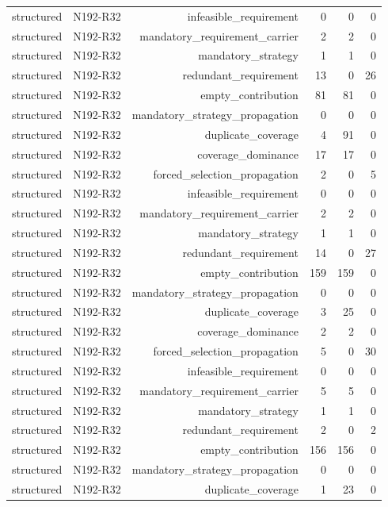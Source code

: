 {\begin{longtable}{lrrrrr}
structured & N192-R32 & infeasible\_requirement & 0 & 0 & 0 \\
structured & N192-R32 & mandatory\_requirement\_carrier & 2 & 2 & 0 \\
structured & N192-R32 & mandatory\_strategy & 1 & 1 & 0 \\
structured & N192-R32 & redundant\_requirement & 13 & 0 & 26 \\
structured & N192-R32 & empty\_contribution & 81 & 81 & 0 \\
structured & N192-R32 & mandatory\_strategy\_propagation & 0 & 0 & 0 \\
structured & N192-R32 & duplicate\_coverage & 4 & 91 & 0 \\
structured & N192-R32 & coverage\_dominance & 17 & 17 & 0 \\
structured & N192-R32 & forced\_selection\_propagation & 2 & 0 & 5 \\
structured & N192-R32 & infeasible\_requirement & 0 & 0 & 0 \\
structured & N192-R32 & mandatory\_requirement\_carrier & 2 & 2 & 0 \\
structured & N192-R32 & mandatory\_strategy & 1 & 1 & 0 \\
structured & N192-R32 & redundant\_requirement & 14 & 0 & 27 \\
structured & N192-R32 & empty\_contribution & 159 & 159 & 0 \\
structured & N192-R32 & mandatory\_strategy\_propagation & 0 & 0 & 0 \\
structured & N192-R32 & duplicate\_coverage & 3 & 25 & 0 \\
structured & N192-R32 & coverage\_dominance & 2 & 2 & 0 \\
structured & N192-R32 & forced\_selection\_propagation & 5 & 0 & 30 \\
structured & N192-R32 & infeasible\_requirement & 0 & 0 & 0 \\
structured & N192-R32 & mandatory\_requirement\_carrier & 5 & 5 & 0 \\
structured & N192-R32 & mandatory\_strategy & 1 & 1 & 0 \\
structured & N192-R32 & redundant\_requirement & 2 & 0 & 2 \\
structured & N192-R32 & empty\_contribution & 156 & 156 & 0 \\
structured & N192-R32 & mandatory\_strategy\_propagation & 0 & 0 & 0 \\
structured & N192-R32 & duplicate\_coverage & 1 & 23 & 0 \\

\end{longtable}}
